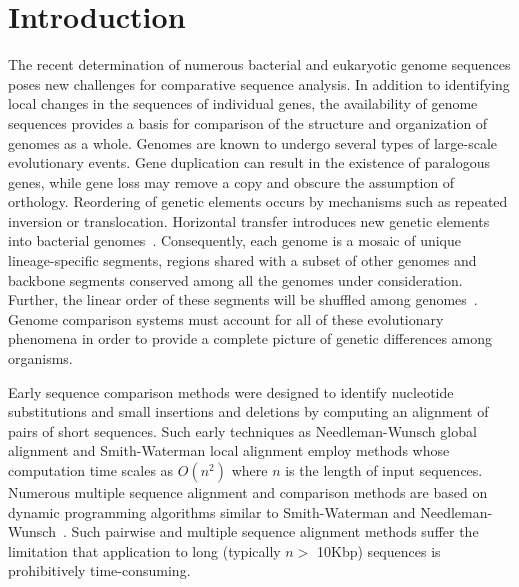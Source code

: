\documentclass[titlepage,11pt]{article}
\begin{document}
\section*{ Introduction }

The recent determination of numerous bacterial and eukaryotic genome sequences
poses new challenges for comparative sequence analysis.  In addition to
identifying local changes in the sequences of individual genes, the
availability of genome sequences provides a basis for comparison of the
structure and organization of genomes as a whole.  Genomes are known to undergo
several types of large-scale evolutionary events.  Gene duplication can result
in the existence of paralogous genes, while gene loss may remove a copy and
obscure the assumption of orthology.  Reordering of genetic elements occurs by
mechanisms such as repeated inversion or translocation.  Horizontal transfer
introduces new genetic elements into bacterial genomes~\citep{hacker_ht}.  Consequently, each
genome is a mosaic of unique lineage-specific segments, regions shared with a
subset of other genomes and backbone segments conserved among all the genomes
under consideration.  Further, the linear order of these segments will be
shuffled among genomes~\citep{bourquepevzner,sankoff}. Genome comparison
systems must account for all of these evolutionary phenomena in order to
provide a complete picture of genetic differences among
organisms.



Early sequence comparison methods were designed to identify nucleotide
substitutions and small insertions and deletions by computing an alignment of
pairs of short sequences.  Such early techniques as Needleman-Wunsch global
alignment and Smith-Waterman local alignment employ methods whose computation
time scales as $O(n^2)$ where $n$ is the length of input sequences.  Numerous
multiple sequence alignment
and comparison methods are based on dynamic programming algorithms similar to
Smith-Waterman and
Needleman-Wunsch~\citep{clustalw,poalign,tcoffee,dialign2,Mor96PNASUSA}.  
Such pairwise and multiple sequence alignment methods suffer the limitation
that application to long (typically $n
>$ 10Kbp) sequences is prohibitively time-consuming.
\end{document}
